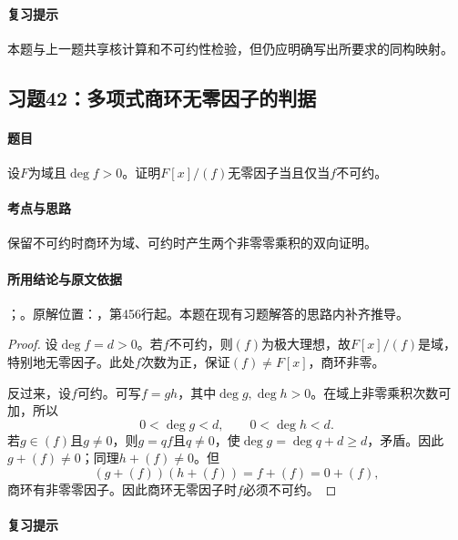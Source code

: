 \paragraph{复习提示}

本题与上一题共享核计算和不可约性检验，但仍应明确写出所要求的同构映射。



\subsection{习题42：多项式商环无零因子的判据}

\label{ex:3:42}

\paragraph{题目}

设$F$为域且$\deg f>0$。证明$F[x]/(f)$无零因子当且仅当$f$不可约。

\paragraph{考点与思路}

保留不可约时商环为域、可约时产生两个非零零乘积的双向证明。

\paragraph{所用结论与原文依据}

；。原解位置：，第456行起。本题在现有习题解答的思路内补齐推导。


\begin{proof}

设$\deg f=d>0$。若$f$不可约，则$(f)$为极大理想，故$F[x]/(f)$是域，特别地无零因子。此处$f$次数为正，保证$(f)\ne F[x]$，商环非零。

反过来，设$f$可约。可写$f=gh$，其中$\deg g,\deg h>0$。在域上非零乘积次数可加，所以
\[
0<\deg g<d,\qquad 0<\deg h<d.
\]
若$g\in(f)$且$g\ne0$，则$g=qf$且$q\ne0$，使$\deg g=\deg q+d\ge d$，矛盾。因此$g+(f)\ne0$；同理$h+(f)\ne0$。但
\[
(g+(f))(h+(f))=f+(f)=0+(f),
\]
商环有非零零因子。因此商环无零因子时$f$必须不可约。

\end{proof}

\paragraph{复习提示}

